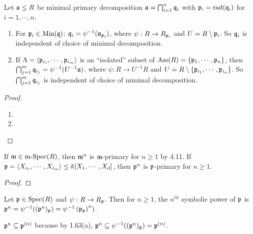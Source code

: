 \begin{theorem}
    Let $\mathfrak{a} \lneq R$ be minimal primary decomposition $\mathfrak{a} = \bigcap_{i=1}^{n} \mathfrak{q}_i$ with $\mathfrak{p}_i = \operatorname{rad}(\mathfrak{q}_i)$ for $i = 1,\cdots,n$. 
    \begin{enumerate}
        \item For $\mathfrak{p}_i \in \operatorname{Min}(\mathfrak{q})$: $\mathfrak{q}_i = \psi^{-1}(\mathfrak{a}_{\mathfrak{p}_i})$, where $\psi: R \to R_{\mathfrak{p}_i}$ and $U = R \setminus \mathfrak{p}_i$. So $\mathfrak{q}_i$ is independent of choice of minimal decomposition.
        \item If $\Lambda = \langle \mathfrak{p}_{i_1},\cdots,\mathfrak{p}_{i_m} \rangle$ is an ``isolated'' subset of $\operatorname{Ass}(R) = \{\mathfrak{p}_1,\cdots,\mathfrak{p}_n\}$, then $\bigcap_{j=1}^{m} \mathfrak{q}_{i_j} = \psi^{-1}(U^{-1}\mathfrak{a})$, where $\psi: R \to U^{-1}R$ and $U = R \setminus \{\mathfrak{p}_{i_1},\cdots,\mathfrak{p}_{i_n}\}$. So $\bigcap_{j=1}^{m}\mathfrak{q}_{i_j}$ is independent of choice of minimal decomposition.
    \end{enumerate}
\end{theorem}


\begin{proof}
    \begin{enumerate}
        \item 
        \item \qedhere
    \end{enumerate}
\end{proof}

\begin{discussion}
    If $\mathfrak{m} \in \operatorname{m-Spec}(R)$, then $\mathfrak{m}^{n}$ is $\mathfrak{m}$-primary for $n \geq 1$ by 4.11. If $\mathfrak{p} = \langle X_{i_1}, \cdots, X_{i_m} \rangle \lneq k[X_1,\cdots,X_d]$, then $\mathfrak{p}^{n}$ is $\mathfrak{p}$-primary for $n \geq 1$.
    \begin{proof}
    \end{proof}
\end{discussion}

\begin{definition}
Let $\mathfrak{p} \in \operatorname{Spec}(R)$ and $\psi: R \to R_{\mathfrak{p}}$. Then for $n \geq 1$, the $n^{th}$ symbolic power of $\mathfrak{p}$ is $\mathfrak{p}^{n} = \psi^{-1}((\mathfrak{p}^{n})_{\mathfrak{p}}) = \psi^{-1}\left( \mathfrak{p}_{\mathfrak{p}} \right)^{n})$. 
\end{definition}

\begin{notation}
    $\mathfrak{p}^{n} \subseteq \mathfrak{p}^{(n)}$ because by 1.63(a), $\mathfrak{p}^{n} \subseteq \psi^{-1}((\mathfrak{p}^{n})_{\mathfrak{p}}) = \mathfrak{p}^{(n)}$.
\end{notation}

